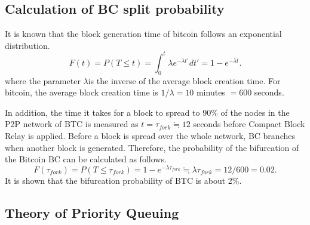 \documentclass[graybox]{svmult}
\begin{document}
\subsection{Calculation of BC split probability}
\label{sec:fork}

It is known that the block generation time of bitcoin follows an exponential distribution.
%
\begin{equation}
	F(t) = P(T \le t) = \int_{0}^{t} \lambda e^{-\lambda t'} dt' = 1 - e^{-\lambda t}. \label{eq:exp}
\end{equation}
%
where the parameter $ \lambda $is the inverse of the average block creation time.
For bitcoin, the average block creation time is $1 / \lambda = 10$ minutes $= 600$ seconds.


In addition, the time it takes for a block to spread to 90\% of the nodes in the P2P network of BTC is measured as $t = \tau_{fork} \fallingdotseq 12$ seconds before Compact Block Relay is applied. 
Before a block is spread over the whole network, BC branches when another block is generated.
Therefore, the probability of the bifurcation of the Bitcoin BC can be calculated as follows.
%
\begin{equation}
  F(\tau_{fork}) = P(T \le \tau_{fork}) = 1 - e^{-\lambda \tau_{fork}} \fallingdotseq \lambda \tau_{fork} = 12/600 = 0.02. 
\end{equation}
%
It is shown that the bifurcation probability of BTC is about 2\%.



\subsection{Theory of Priority Queuing}
\label{sec:priorityqueue}
\end{document}
